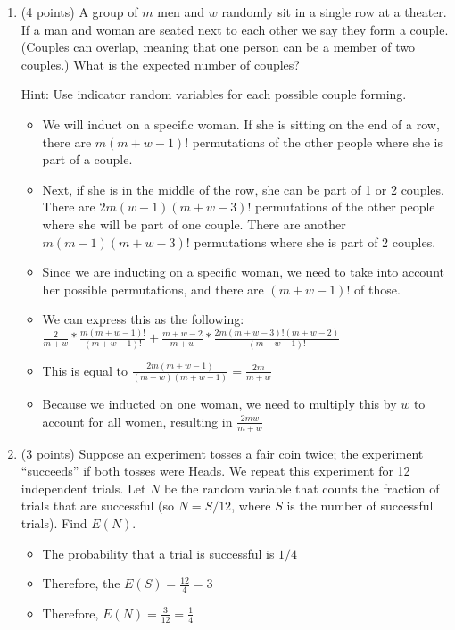 \documentclass[11pt]{article}
\begin{document}
\begin{enumerate}
\item (4 points) A group of $m$ men and $w$ randomly sit in a single row at a
theater.  If a man and woman are seated next to each other we say they form a
couple.  (Couples can overlap, meaning that one person can be a member of two
couples.)  What is the expected number of couples?
\begin{small}\textsf{Hint: Use indicator
random variables for each possible couple forming.
}\end{small}

\begin{itemize}
	\item We will induct on a specific woman. If she is sitting on the end of a 
	row, there are $m(m+w-1)!$ permutations of the other people where she is
	part of a couple.
	\item Next, if she is in the middle of the row, she can be part of 1 or 2 
	couples. There are $2m(w-1)(m+w-3)!$ permutations of the other people where 
	she will be part of one couple. There are another $m(m-1)(m+w-3)!$ 
	permutations where she is part of 2 couples.
	\item Since we are inducting on a specific woman, we need to take into 
	account her possible permutations, and there are $(m+w-1)!$ of those.
	\item We can express this as the following:
	$\frac{2}{m+w} * \frac{m(m+w-1)!}{(m+w-1)!} + \frac{m+w-2}{m+w} * 
	\frac{2m(m+w-3)!(m+w-2)}{(m+w-1)!}$
	\item This is equal to $\frac{2m(m+w-1)}{(m+w)(m+w-1)} = \frac{2m}{m+w}$
	\item Because we inducted on one woman, we need to multiply this by $w$
	to account for all women, resulting in $\frac{2mw}{m+w}$
\end{itemize}

\item (3 points) Suppose an experiment tosses a fair coin twice;  the experiment
``succeeds'' if both tosses were Heads.  We repeat this experiment 
for 12 independent trials.  Let $N$ be the random variable that counts
the fraction of trials that are successful (so $N = S/12$, where
$S$ is the number of successful trials).  Find $E(N)$.

\begin{itemize}
	\item The probability that a trial is successful is $1/4$
	\item Therefore, the $E(S) = \frac{12}{4} = 3$
	\item Therefore, $E(N) = \frac{3}{12} = \frac{1}{4}$
\end{itemize}


\end{enumerate}
\end{document}
